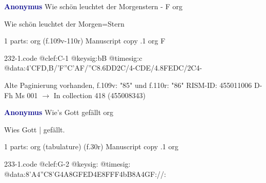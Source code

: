 \documentclass[twocolumn]{book}
\begin{document}
\newline \par \vspace{7pt} \textcolor{darkblue}{\textbf{Anonymus  }}
\newline Wie schön leuchtet der Morgenstern - F
\newline org
\newline \begin{itshape}[f.109v, heading:] Wie schön leuchtet der Morgen=Stern\end{itshape} 
\newline \textcolor{darkblue}{}  1 parts: org  (f.109v-110r)
\newline Manuscript copy
.1  org  F  
\begin{filecontents*}{232-1.code}
@clef:C-1
@keysig:bB
@timesig:c
@data:4'CFD,B/'F''C'AF/''C{8.6DD}2C/4-CDE/4.8FEDC/2C4-
\end{filecontents*}
\newline
%

\newline Alte Paginierung vorhanden, f.109v: "85" und f.110r: "86"
\newline RISM-ID: 455011006
\newline D-Fh  Ms 001
\newline $\rightarrow$ In collection 418 (455008343)
      
\newline \par \vspace{7pt} \textcolor{darkblue}{\textbf{Anonymus  }}
\newline Wie's Gott gefällt
\newline org
\newline \begin{itshape}[f.30r, at left:] Wies Gott | gefällt.\end{itshape} 
\newline \textcolor{darkblue}{}  1 parts: org (tabulature)  (f.30r)
\newline Manuscript copy
.1  org  
\begin{filecontents*}{233-1.code}
@clef:G-2
@keysig:
@timesig:
@data:8'A4''C8'G4A8G{FE}D4E{8FFF}4bB8A4GF://:
\end{filecontents*}
\newline
%
\end{document}
